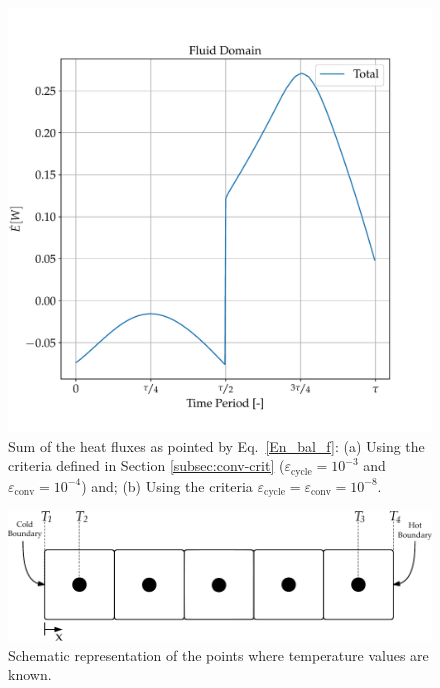\documentclass[review,preprint,12pt]{elsarticle}
\begin{document}
\begin{figure}[!ht]
  \centering
  \includegraphics[scale=0.6]{CE_fluid_3.pdf}
  \caption{Sum of the heat fluxes as pointed by Eq.~\eqref{En_bal_f}: (a) Using the criteria defined in Section \ref{subsec:conv-crit} ($\varepsilon_\textrm{cycle}= 10^{-3}$ and $\varepsilon_\textrm{conv} = 10^{-4}$) and; (b) Using the criteria $\varepsilon_\textrm{cycle}= \varepsilon_\textrm{conv} = 10^{-8}$.}
  \label{fig:CE_fluid_2}
\end{figure}

\begin{figure}[!ht]
  \centering
  \includegraphics[scale=0.8]{CE_fluid_adv.pdf}
  \caption{Schematic representation of the points where temperature values are known.}
  \label{fig:CE_fluid_adv}
\end{figure}
\end{document}
